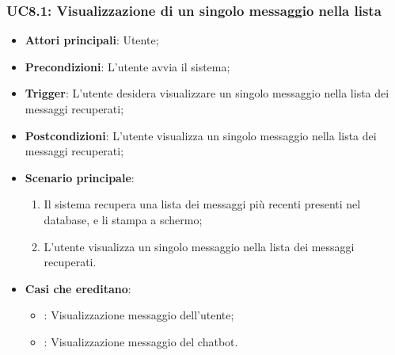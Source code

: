 \subsubsection{UC8.1: Visualizzazione di un singolo messaggio nella lista}
\begin{itemize}
    \item \textbf{Attori principali}: Utente;
    \item \textbf{Precondizioni}: L'utente avvia il sistema;
    \item \textbf{Trigger}: L'utente desidera visualizzare un singolo messaggio nella lista dei messaggi recuperati;
    \item \textbf{Postcondizioni}: L'utente visualizza un singolo messaggio nella lista dei messaggi recuperati;
    \item \textbf{Scenario principale}:
    \begin{enumerate}
        \item Il sistema recupera una lista dei messaggi più recenti presenti nel database, e li stampa a schermo;
        \item L'utente visualizza un singolo messaggio nella lista dei messaggi recuperati.
    \end{enumerate}
    \item \textbf{Casi che ereditano}:
    \begin{itemize}
        \item {}: Visualizzazione messaggio dell'utente;
        \item {}: Visualizzazione messaggio del chatbot.
    \end{itemize}
\end{itemize}

\hypertarget{UC8.2}{}

